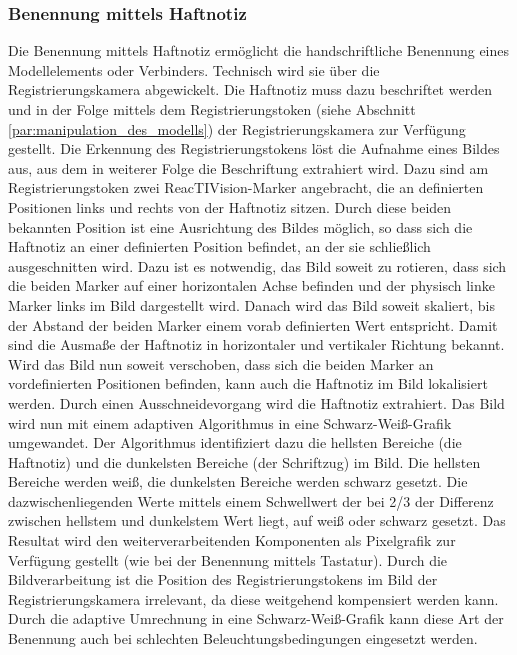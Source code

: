 
\subsubsection{Benennung mittels Haftnotiz} %
\label{ssub:benennung_mittels_haftnotiz}

Die Benennung mittels Haftnotiz ermöglicht die handschriftliche Benennung eines Modellelements oder Verbinders. Technisch wird sie über die Registrierungskamera abgewickelt. Die Haftnotiz muss dazu beschriftet werden und in der Folge mittels dem Registrierungstoken (siehe Abschnitt \ref{par:manipulation_des_modells}) der Registrierungskamera zur Verfügung gestellt. Die Erkennung des Registrierungstokens löst die Aufnahme eines Bildes aus, aus dem in weiterer Folge die Beschriftung extrahiert wird. Dazu sind am Registrierungstoken zwei ReacTIVision-Marker angebracht, die an definierten Positionen links und rechts von der Haftnotiz sitzen. Durch diese beiden bekannten Position ist eine Ausrichtung des Bildes möglich, so dass sich die Haftnotiz an einer definierten Position befindet, an der sie schließlich ausgeschnitten wird. Dazu ist es notwendig, das Bild soweit zu rotieren, dass sich die beiden Marker auf einer horizontalen Achse befinden und der physisch linke Marker links im Bild dargestellt wird. Danach wird das Bild soweit skaliert, bis der Abstand der beiden Marker einem vorab definierten Wert entspricht. Damit sind die Ausmaße der Haftnotiz in horizontaler und vertikaler Richtung bekannt. Wird das Bild nun soweit verschoben, dass sich die beiden Marker an vordefinierten Positionen befinden, kann auch die Haftnotiz im Bild lokalisiert werden. Durch einen Ausschneidevorgang wird die Haftnotiz extrahiert. Das Bild wird nun mit einem adaptiven Algorithmus in eine Schwarz-Weiß-Grafik umgewandet. Der Algorithmus identifiziert dazu die hellsten Bereiche (die Haftnotiz) und die dunkelsten Bereiche (der Schriftzug) im Bild. Die hellsten Bereiche werden weiß, die dunkelsten Bereiche werden schwarz gesetzt. Die dazwischenliegenden Werte mittels einem Schwellwert der bei 2/3 der Differenz zwischen hellstem und dunkelstem Wert liegt, auf weiß oder schwarz gesetzt. Das Resultat wird den weiterverarbeitenden Komponenten als Pixelgrafik zur Verfügung gestellt (wie bei der Benennung mittels Tastatur). Durch die Bildverarbeitung ist die Position des Registrierungstokens im Bild der Registrierungskamera irrelevant, da diese weitgehend kompensiert werden kann. Durch die adaptive Umrechnung in eine Schwarz-Weiß-Grafik kann diese Art der Benennung auch bei schlechten Beleuchtungsbedingungen eingesetzt werden.

